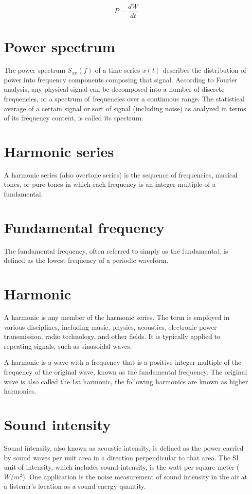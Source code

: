 \documentclass[journal,compsoc]{IEEEtran}
\begin{document}
\[ P = \frac{dW}{dt} \]

\section{Power spectrum}
The power spectrum \( S_{xx}(f)\) of a time series \(x(t)\) describes the distribution of power into frequency components composing that signal. According to Fourier analysis, any physical signal can be decomposed into a number of discrete frequencies, or a spectrum of frequencies over a continuous range. The statistical average of a certain signal or sort of signal (including noise) as analyzed in terms of its frequency content, is called its spectrum.

\section{Harmonic series}
A harmonic series (also overtone series) is the sequence of frequencies, musical tones, or pure tones in which each frequency is an integer multiple of a fundamental.

\section{Fundamental frequency}
The fundamental frequency, often referred to simply as the fundamental, is defined as the lowest frequency of a periodic waveform.

\section{Harmonic}
A harmonic is any member of the harmonic series. The term is employed in various disciplines, including music, physics, acoustics, electronic power transmission, radio technology, and other fields. It is typically applied to repeating signals, such as sinusoidal waves.

A harmonic is a wave with a frequency that is a positive integer multiple of the frequency of the original wave, known as the fundamental frequency. The original wave is also called the 1st harmonic, the following harmonics are known as higher harmonics.

\section{Sound intensity}

Sound intensity, also known as acoustic intensity, is defined as the power carried by sound waves per unit area in a direction perpendicular to that area. The SI unit of intensity, which includes sound intensity, is the watt per square meter (\(W/m^2\)). One application is the noise measurement of sound intensity in the air at a listener's location as a sound energy quantity.
\end{document}
